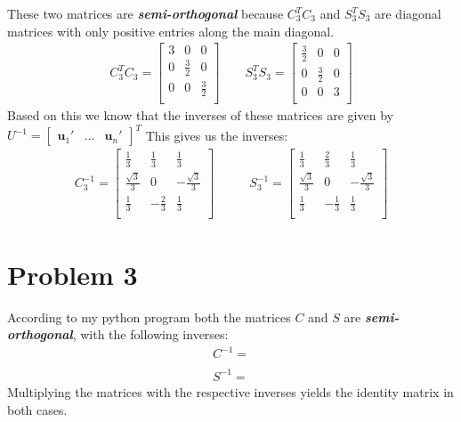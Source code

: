 \documentclass[paper=a4, fontsize=11pt]{scrartcl} %
\numberwithin{equation}{section} %
\numberwithin{figure}{section} %
\numberwithin{table}{section} %
\theoremstyle{definition}
\begin{document}
These two matrices are \textit{\textbf{semi-orthogonal}} because $C_3^TC_3$ and $S_3^TS_3$ are diagonal matrices with only positive entries along the main diagonal.
\begin{align*}
  C_3^TC_3 = \begin{bmatrix}
	3 & 0 & 0 \\
	0 & \frac{3}{2} & 0 \\
	0 & 0 & \frac{3}{2}\\
  \end{bmatrix} \qquad S_3^TS_3 =
  \begin{bmatrix}
	\frac{3}{2} & 0 & 0 \\
	0 & \frac{3}{2} & 0 \\
	0 & 0 & 3\\
  \end{bmatrix}
\end{align*}
Based on this we know that the inverses of these matrices are given by $U^{-1} = \begin{bmatrix}
  \mathbf{u}_1' & \dots & \mathbf{u}_n'
\end{bmatrix}^T$
This gives us the inverses:
\begin{align*}
  C_3^{-1} = 
 \begin{bmatrix}
   \frac{1}{3} & \frac{1}{3} & \frac{1}{3} \\
   \frac{\sqrt{3}}{3} & 0 &  -\frac{\sqrt{3}}{3} \\
   \frac{1}{3} & -\frac{2}{3} & \frac{1}{3}\\
 \end{bmatrix} \qquad & S_3^{-1} = 
 \begin{bmatrix}
   \frac{1}{3} & \frac{2}{3} & \frac{1}{3}\\
   \frac{\sqrt{3}}{3} & 0 & -\frac{\sqrt{3}}{3}\\
   \frac{1}{3} & -\frac{1}{3} & \frac{1}{3}\\
 \end{bmatrix}
\end{align*}

\section*{Problem 3}
According to my python program both the matrices $C$ and $S$ are \textit{\textbf{semi-orthogonal}}, with the following inverses:
\begin{align*}
  C^{-1} = \\
  \\
  S^{-1} = 
\end{align*}
Multiplying the matrices with the respective inverses yields the identity matrix in both cases.
\end{document}

